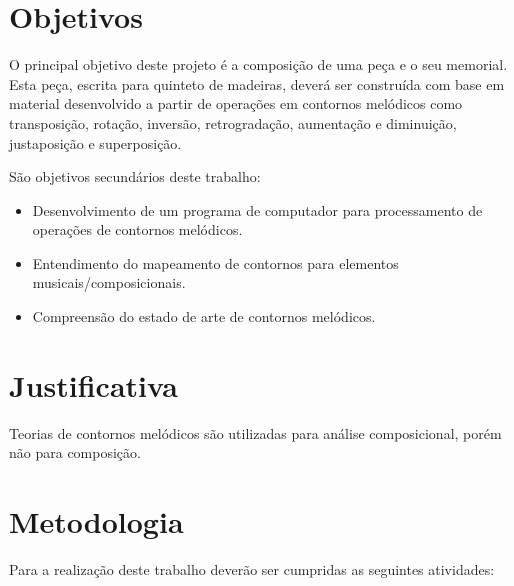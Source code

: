 \documentclass{article}
\begin{document}
\section{Objetivos}
\label{sec:objetivos}

O principal objetivo deste projeto é  a composição de uma peça e o seu
memorial.  Esta peça, escrita  para quinteto  de madeiras,  deverá ser
construída com base em material  desenvolvido a partir de operações em
contornos    melódicos   como    transposição,    rotação,   inversão,
retrogradação, aumentação e diminuição, justaposição e superposição.

São objetivos secundários deste trabalho:

\begin{itemize}
\item Desenvolvimento de um programa de computador para processamento
  de operações de contornos melódicos.
\item Entendimento do mapeamento de contornos para elementos
  musicais/composicionais.
\item Compreensão do estado de arte de contornos melódicos.
\end{itemize}

\section{Justificativa}
\label{sec:justificativa}


Teorias de contornos melódicos são utilizadas para análise
composicional, porém não para composição.

\section{Metodologia}
\label{sec:metodologia}


Para a realização deste trabalho deverão ser cumpridas as seguintes
atividades:
\end{document}
